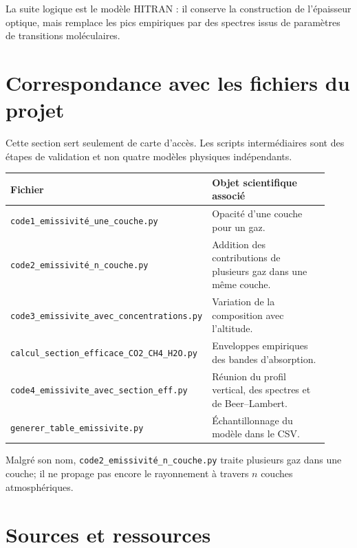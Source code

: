 \documentclass[11pt,a4paper]{article}
\newcommand{\code}[1]{\texttt{#1}}
\begin{document}
La suite logique est le modèle HITRAN : il conserve la construction de
l'épaisseur optique, mais remplace les pics empiriques par des spectres issus
de paramètres de transitions moléculaires.

\section{Correspondance avec les fichiers du projet}

Cette section sert seulement de carte d'accès. Les scripts intermédiaires sont
des étapes de validation et non quatre modèles physiques indépendants.

\begin{table}[ht]
\centering
\small
\begin{tabular}{p{0.43\linewidth}p{0.49\linewidth}}
\toprule
Fichier & Objet scientifique associé \\
\midrule
\code{code1\_emissivité\_une\_couche.py} & Opacité d'une couche pour un gaz. \\
\code{code2\_emissivité\_n\_couche.py} & Addition des contributions de
plusieurs gaz dans une même couche. \\
\code{code3\_emissivite\_avec\_concentrations.py} & Variation de la
composition avec l'altitude. \\
\code{calcul\_section\_efficace\_CO2\_CH4\_H2O.py} & Enveloppes empiriques
des bandes d'absorption. \\
\code{code4\_emissivite\_avec\_section\_eff.py} & Réunion du profil vertical,
des spectres et de Beer--Lambert. \\
\code{generer\_table\_emissivite.py} & Échantillonnage du modèle dans le CSV. \\
\bottomrule
\end{tabular}
\end{table}

Malgré son nom, \code{code2\_emissivité\_n\_couche.py} traite plusieurs gaz
dans une couche; il ne propage pas encore le rayonnement à travers $n$
couches atmosphériques.

\section{Sources et ressources}
\end{document}
